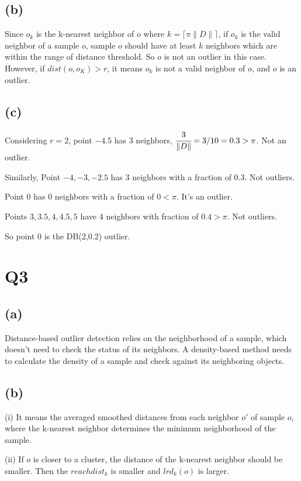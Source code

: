 \documentclass[]{article}
\begin{document}
\subsection*{(b)} 
Since $o_k$ is the k-nearest neighbor of $o$ where $k=\lceil\pi\|D\|\rceil$, if $o_k$ is the valid neighbor of a sample $o$, sample $o$ should have at least $k$ neighbors which are within the range of distance threshold. So $o$ is not an outlier in this case. However, if $dist(o,o_K)>r$, it means $o_k$ is not a valid neighbor of $o$, and $o$ is an outlier. 

\subsection*{(c)}
Considering $r=2$, point $-4.5$ has 3 neighbors, $\cfrac{3}{\|D\|}=3/10=0.3>\pi$. Not an outlier. 

Similarly, Point $-4,-3,-2.5$ has 3 neighbors with a fraction of $0.3$. Not outliers. 

Point $0$ has 0 neighbors with a fraction of $0<\pi$. It's an outlier.

Points $3, 3.5, 4, 4.5, 5$ have 4 neighbors with fraction of $0.4>\pi$. Not outliers. 

So point $0$ is the DB(2,0.2) outlier. 

\newpage

\section*{Q3}
\subsection*{(a)} Distance-based outlier detection relies on the neighborhood of a sample, which doesn't need to check the status of its neighbors. A density-based method needs to calculate the density of a sample and check against its neighboring objects. 

\subsection*{(b)} 
(i) It means the averaged smoothed distances from each neighbor $o'$ of sample $o$, where the k-nearest neighbor determines the minimum neighborhood of the sample. 

(ii) If $o$ is closer to a cluster, the distance of the k-nearest neighbor should be smaller. Then the $reachdist_k$ is smaller and $lrd_k(o)$ is larger. 
\end{document}

